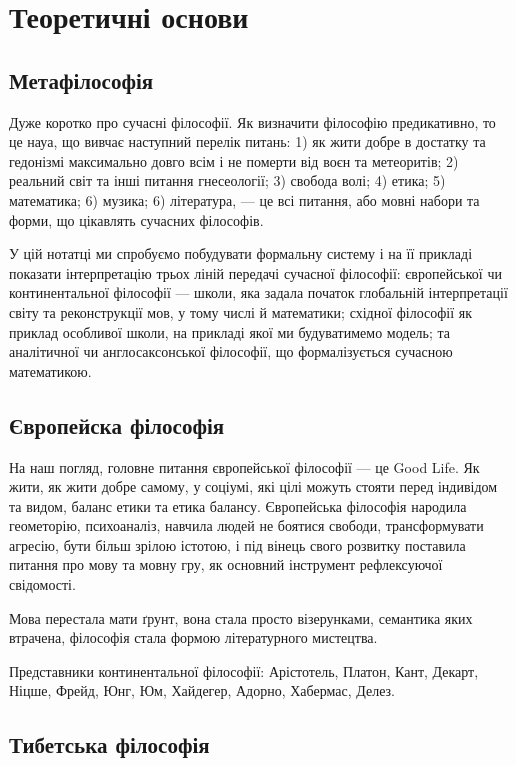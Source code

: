 \section{Теоретичні основи}

\subsection{Метафілософія}

Дуже коротко про сучасні філософії. Як визначити філософію предикативно,
то це науа, що вивчає наступний перелік питань:
1) як жити добре в достатку та гедонізмі максимально довго всім і не померти від воєн та метеоритів;
2) реальний світ та інші питання гнесеології;
3) свобода волі;
4) етика;
5) математика;
6) музика;
6) література,
--- це всі питання, або мовні набори та форми, що цікавлять сучасних філософів.

У цій нотатці ми спробуємо побудувати формальну систему
і на її прикладі показати інтерпретацію трьох ліній
передачі сучасної філософії: європейської чи континентальної
філософії --- школи, яка задала початок глобальній
інтерпретації світу та реконструкції мов, у тому числі
й математики; східної філософії як приклад особливої школи,
на прикладі якої ми будуватимемо модель; та аналітичної чи
англосаксонської філософії, що формалізується сучасною математикою.

\subsection{Європейска філософія}

На наш погляд, головне питання європейської філософії --- це Good Life.
Як жити, як жити добре самому, у соціумі, які цілі можуть стояти перед
індивідом та видом, баланс етики та етика балансу. Європейська
філософія народила геометорію, психоаналіз, навчила людей не
боятися свободи, трансформувати агресію, бути більш зрілою
істотою, і під вінець свого розвитку поставила питання про
мову та мовну гру, як основний інструмент рефлексуючої свідомості.

Мова перестала мати ґрунт, вона стала просто візерунками, семантика
яких втрачена, філософія стала формою літературного мистецтва.

Представники континентальної філософії: Арістотель, Платон, Кант,
Декарт, Ніцше, Фрейд, Юнг, Юм, Хайдегер, Адорно, Хабермас, Делез.

\subsection{Тибетська філософія}

